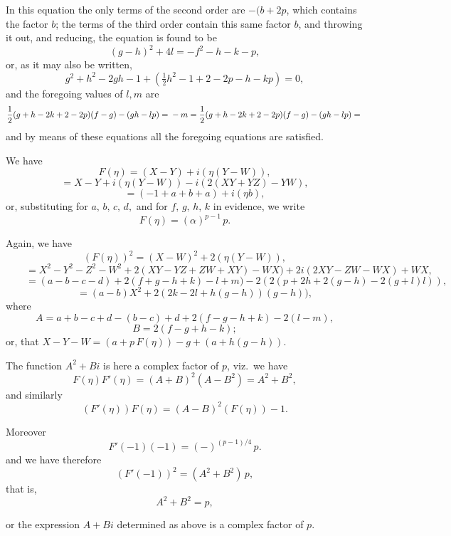 \documentclass[11pt]{article}
\begin{document}
\newpage

\noindent
In this equation the only terms of the second order are $-(b + 2p$, which contains the
factor $b$; the terms of the third order contain this same factor $b$, and throwing it out,
and reducing, the equation is found to be
\[
(g - h)^2 + 4l = -f^2 - h - k - p,
\]
or, as it may also be written,
\[
g^2 + h^2 - 2gh - 1 + (\tfrac{1}{2}h^2 - 1 + 2 - 2p - h - kp) = 0,
\]
and the foregoing values of $l,m$ are
\[
\frac{1}{2}(g + h - 2k + 2 - 2p)(f - g) - (gh - lp) = \\
- m = \frac{1}{2}(g + h - 2k + 2 - 2p)(f - g) - (gh - lp) = \\
\]
and by means of these equations all the foregoing equations are satisfied.

\medskip

\noindent
We have
\[
F(\eta) = (X - Y) + i(\eta(Y - W)),
\]
\[
= X - Y + i(\eta(Y - W)) - i(2(XY + YZ) - YW),
\]
\[
\qquad = (- 1 + a + b + a) + i(\eta b),
\]
or, substituting for $a,\,b,\,c,\,d,$ and for $f,\,g,\,h,\,k$ in evidence, we write
\[
F(\eta) = (\alpha)^{p-1}\,p.
\]

\noindent
Again, we have
\[
(F(\eta))^2 = (X - W)^2 + 2(\eta(Y - W)),
\]
\[
\qquad = X^2 - Y^2 - Z^2 - W^2 + 2(XY - YZ + ZW + XY) - WX) + 2i(2XY - ZW - WX) + WX,
\]
\[
\qquad = (a - b - c - d) + 2(f + g - h + k) - l + m) - 2(2(p + 2h + 2(g - h) - 2(g + l)l)),
\]
\[
\qquad = (a - b)X^2 + 2(2k - 2l + h(g - h))(g - h)),
\]
where
\[
A = a + b - c + d - (b - c) + d + 2(f - g - h + k) - 2(l - m),
\]
\[
B = 2(f - g + h - k);
\]
or, that $X - Y - W = (a + p\,F(\eta)) - g + (a + h(g - h)).$

\medskip

\noindent
The function $A^2 + Bi$ is here a complex factor of $p$, viz.\ we have
\[
F(\eta)F'(\eta) = (A + B)^2(A - B^2) = A^2 + B^2,
\]
and similarly
\[
(F'(\eta))F(\eta) = (A - B)^2(F(\eta)) - 1.
\]

\newpage

\noindent
Moreover
\[
F'(-1)(-1) = (-)^{(p-1)/4}\,p.
\]
\noindent
and we have therefore
\[
(F'(-1))^2 = (A^2 + B^2)\,p,
\]
that is,
\[
A^2 + B^2 = p,
\]

\noindent
or the expression $A + Bi$ determined as above is a complex factor of $p$.
\end{document}
